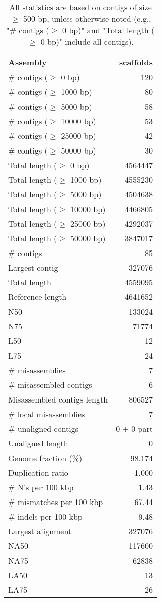 \documentclass[12pt,a4paper]{article}
\begin{document}
\begin{table}[ht]
\begin{center}
\caption{All statistics are based on contigs of size $\geq$ 500 bp, unless otherwise noted (e.g., "\# contigs ($\geq$ 0 bp)" and "Total length ($\geq$ 0 bp)" include all contigs).}
\begin{tabular}{|l*{1}{|r}|}
\hline
Assembly & scaffolds \\ \hline
\# contigs ($\geq$ 0 bp) & 120 \\ \hline
\# contigs ($\geq$ 1000 bp) & 80 \\ \hline
\# contigs ($\geq$ 5000 bp) & 58 \\ \hline
\# contigs ($\geq$ 10000 bp) & 53 \\ \hline
\# contigs ($\geq$ 25000 bp) & 42 \\ \hline
\# contigs ($\geq$ 50000 bp) & 30 \\ \hline
Total length ($\geq$ 0 bp) & 4564447 \\ \hline
Total length ($\geq$ 1000 bp) & 4555230 \\ \hline
Total length ($\geq$ 5000 bp) & 4504638 \\ \hline
Total length ($\geq$ 10000 bp) & 4466805 \\ \hline
Total length ($\geq$ 25000 bp) & 4292037 \\ \hline
Total length ($\geq$ 50000 bp) & 3847017 \\ \hline
\# contigs & 85 \\ \hline
Largest contig & 327076 \\ \hline
Total length & 4559095 \\ \hline
Reference length & 4641652 \\ \hline
N50 & 133024 \\ \hline
N75 & 71774 \\ \hline
L50 & 12 \\ \hline
L75 & 24 \\ \hline
\# misassemblies & 7 \\ \hline
\# misassembled contigs & 6 \\ \hline
Misassembled contigs length & 806527 \\ \hline
\# local misassemblies & 7 \\ \hline
\# unaligned contigs & 0 + 0 part \\ \hline
Unaligned length & 0 \\ \hline
Genome fraction (\%) & 98.174 \\ \hline
Duplication ratio & 1.000 \\ \hline
\# N's per 100 kbp & 1.43 \\ \hline
\# mismatches per 100 kbp & 67.44 \\ \hline
\# indels per 100 kbp & 9.48 \\ \hline
Largest alignment & 327076 \\ \hline
NA50 & 117600 \\ \hline
NA75 & 62838 \\ \hline
LA50 & 13 \\ \hline
LA75 & 26 \\ \hline
\end{tabular}
\end{center}
\end{table}
\end{document}

